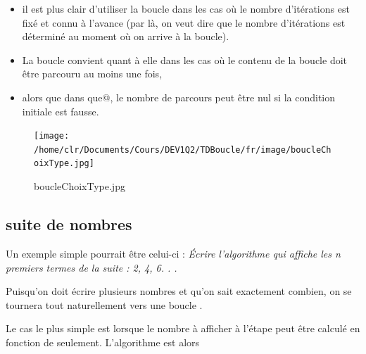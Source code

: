 \documentclass[11pt,a4paper]{article}
\begin{document}
					\begin{itemize}
				
			\item 
              il est plus clair d'utiliser la boucle \verb@pour@ 
              dans les cas o\`u le nombre d'it\'erations est fix\'e et connu \`a l'avance
              (par l\`a, on veut dire que le nombre d'it\'erations est d\'etermin\'e au moment o\`u on arrive \`a la boucle). 
            
			\item 
              La boucle \verb@faire@ convient quant \`a elle dans les cas o\`u le contenu de la boucle doit \^etre parcouru au moins une fois,
            
			\item 
              alors que dans \verb@tant que@, le nombre de parcours peut \^etre nul si la condition initiale est fausse.
            
					\end{itemize}
				
            \par
        \begin{figure}[hbt]
				    \begin{center}
					\texttt{[image: /home/clr/Documents/Cours/DEV1Q2/TDBoucle/fr/image/boucleChoixType.jpg]}
						\end{center}
                
                    \caption[boucleChoixType.jpg]{boucleChoixType.jpg}
                \end{figure}
                    
            \par
        \subsection{suite de nombres}
		    Un exemple simple pourrait \^etre celui-ci : 
		    \guillemotleft  \textit{\'Ecrire l'algorithme qui affiche les n premiers
        termes de la suite : 2, 4, 6. . . }\guillemotright 
      
            \par
        
        Puisqu'on doit \'ecrire plusieurs nombres et qu'on sait exactement combien, 
        on se tournera tout naturellement vers une boucle \verb@pour@.
      
            \par
        
        Le cas le plus simple est lorsque le nombre \`a afficher \`a l'\'etape \verb@i@ 
        peut \^etre calcul\'e en fonction de \verb@i@ seulement. L'algorithme est alors
      
\end{document}

